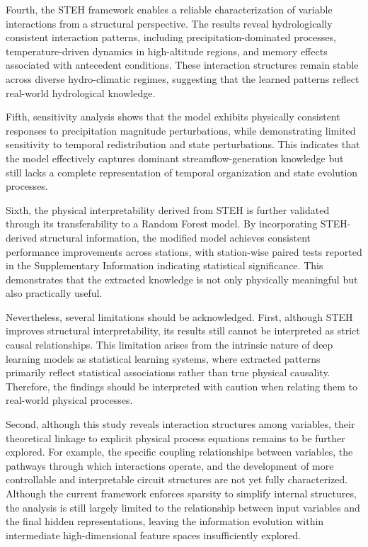 Fourth, the STEH framework enables a reliable characterization of variable interactions from a structural perspective. The results reveal hydrologically consistent interaction patterns, including precipitation-dominated processes, temperature-driven dynamics in high-altitude regions, and memory effects associated with antecedent conditions. These interaction structures remain stable across diverse hydro-climatic regimes, suggesting that the learned patterns reflect real-world hydrological knowledge.

Fifth, sensitivity analysis shows that the model exhibits physically consistent responses to precipitation magnitude perturbations, while demonstrating limited sensitivity to temporal redistribution and state perturbations. This indicates that the model effectively captures dominant streamflow-generation knowledge but still lacks a complete representation of temporal organization and state evolution processes.

Sixth, the physical interpretability derived from STEH is further validated through its transferability to a Random Forest model. By incorporating STEH-derived structural information, the modified model achieves consistent performance improvements across stations, with station-wise paired tests reported in the Supplementary Information indicating statistical significance. This demonstrates that the extracted knowledge is not only physically meaningful but also practically useful.

Nevertheless, several limitations should be acknowledged. First, although STEH improves structural interpretability, its results still cannot be interpreted as strict causal relationships\cite{lipton2018mythos}. This limitation arises from the intrinsic nature of deep learning models as statistical learning systems\cite{pearl2018theoreticalimpedimentsmachinelearning}, where extracted patterns primarily reflect statistical associations rather than true physical causality. Therefore, the findings should be interpreted with caution when relating them to real-world physical processes.

Second, although this study reveals interaction structures among variables, their theoretical linkage to explicit physical process equations remains to be further explored. For example, the specific coupling relationships between variables, the pathways through which interactions operate, and the development of more controllable and interpretable circuit structures are not yet fully characterized\cite{pach2025sparseautoencoderslearnmonosemantic}. Although the current framework enforces sparsity to simplify internal structures, the analysis is still largely limited to the relationship between input variables and the final hidden representations, leaving the information evolution within intermediate high-dimensional feature spaces insufficiently explored.

